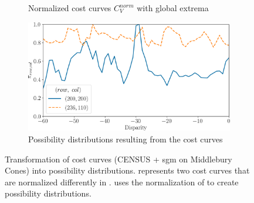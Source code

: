 \begin{figure}
\begin{subfigure}[t]{0.47\linewidth}
        \caption{Normalized cost curves $C_V^{norm}$ with global extrema}
        \label{fig:cost_curves_c}
    \end{subfigure}\hfill
    \begin{subfigure}[t]{0.47\linewidth}
        \centering
        \includegraphics[width=\linewidth]{Images/Chap_5/cost_curve_possibility_distribution.png}
        \caption{Possibility distributions resulting from the cost curves}
        \label{fig:cost_curves_d}
    \end{subfigure}\hfill
    \caption{Transformation of cost curves (CENSUS + \acrshort{sgm} on Middlebury Cones) into possibility distributions.  represents two cost curves that are normalized differently in .  uses the normalization of  to create possibility distributions.}
    \label{fig:cost_curves_to_possibility}
\end{figure}

